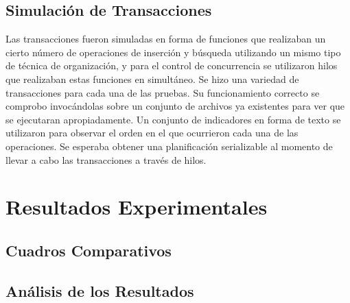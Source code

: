 \documentclass{article}
\begin{document}
    \subsection{Simulación de Transacciones}

      Las transacciones fueron simuladas en forma de funciones que realizaban un cierto número de operaciones de inserción y búsqueda utilizando un mismo tipo de técnica de organización, y para el control de concurrencia se utilizaron hilos que realizaban estas funciones en simultáneo. Se hizo una variedad de transacciones para cada una de las pruebas. Su funcionamiento correcto se comprobo invocándolas sobre un conjunto de archivos ya existentes para ver que se ejecutaran apropiadamente. Un conjunto de indicadores en forma de texto se utilizaron para observar el orden en el que ocurrieron cada una de las operaciones. Se esperaba obtener una planificación serializable al momento de llevar a cabo las transacciones a través de hilos.

  \section{Resultados Experimentales}

    \subsection{Cuadros Comparativos}

    \subsection{Análisis de los Resultados}
\end{document}
